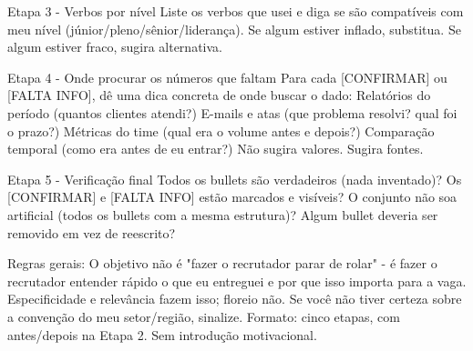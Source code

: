 \documentclass[11pt, a4paper]{article}
\begin{document}
\begin{promptbox}
Etapa 3 - Verbos por nível
 Liste os verbos que usei e diga se são compatíveis com meu nível (júnior/pleno/sênior/liderança). Se algum estiver inflado, substitua. Se algum estiver fraco, sugira alternativa.
	
Etapa 4 - Onde procurar os números que faltam
 Para cada [CONFIRMAR] ou [FALTA INFO], dê uma dica concreta de onde buscar o dado:
 Relatórios do período (quantos clientes atendi?)
 E-mails e atas (que problema resolvi? qual foi o prazo?)
 Métricas do time (qual era o volume antes e depois?)
 Comparação temporal (como era antes de eu entrar?)
 Não sugira valores. Sugira fontes.
	
Etapa 5 - Verificação final
 Todos os bullets são verdadeiros (nada inventado)?
 Os [CONFIRMAR] e [FALTA INFO] estão marcados e visíveis?
 O conjunto não soa artificial (todos os bullets com a mesma estrutura)?
 Algum bullet deveria ser removido em vez de reescrito?
	
Regras gerais:
 O objetivo não é "fazer o recrutador parar de rolar" - é fazer o recrutador entender rápido o que eu entreguei e por que isso importa para a vaga. Especificidade e relevância fazem isso; floreio não.
 Se você não tiver certeza sobre a convenção do meu setor/região, sinalize.
 Formato: cinco etapas, com antes/depois na Etapa 2. Sem introdução motivacional.
\end{promptbox}
\end{document}
